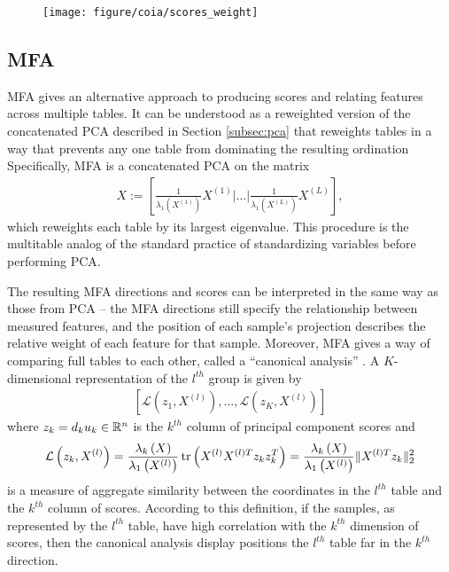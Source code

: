 \documentclass{article}
\begin{document}
\begin{figure}[ht]
  \centering
  \texttt{[image: figure/coia/scores\_weight]}
  \caption{\label{fig:label} }
\end{figure}

\subsection{MFA}
\label{sec:mfa}

MFA gives an alternative approach to producing scores and relating features
across multiple tables\cite{pages2014multiple}. It can be understood as a
reweighted version of the concatenated PCA described in Section \ref{subsec:pca}
that reweights tables in a way that prevents any one table from dominating the
resulting ordination Specifically, MFA is a concatenated PCA on the matrix
\begin{align*}
X := \left[\frac{1}{\lambda_{1}\left(X^{(1)}\right)}X^{(1)} \vert \dots
  \vert \frac{1}{\lambda_{1}\left(X^{(L)}\right)}X^{(L)}\right],
\end{align*}
which reweights each table by its largest eigenvalue. This procedure is the
multitable analog of the standard practice of standardizing variables before
performing PCA.

The resulting MFA directions and scores can be interpreted in the same
way as those from PCA -- the MFA directions still specify the
relationship between measured features, and the position of each
sample's projection describes the relative weight of each feature for
that sample. Moreover, MFA gives a way of comparing full tables to
each other, called a ``canonical analysis'' \cite{pages2004multiple}. A
$K$-dimensional representation of the $l^{th}$ group is given by
\begin{align*}
\left[\mathcal{L}\left(z_{1}, X^{(l)}\right), \dots,
  \mathcal{L}\left(z_{K}, X^{(l)}\right)\right]
\end{align*}
where $z_{k} = d_{k}u_{k} \in \mathbb{R}^{n}$ is the $k^{th}$ column of principal
component scores and
\begin{align*}
  \mathcal{L}\left(z_{k}, X^{(l)}\right) =
  \frac{\lambda_{k}\left(X\right)}{\lambda_{1}\left(X^{(l)}\right)}\mathop\mathrm{tr}\left(X^{(l)}X^{(l)
      T} z_{k}z_{k}^{T}\right) =
  \frac{\lambda_{k}\left(X\right)}{\lambda_{1}\left(X^{(l)}\right)}\|X^{(l)
  T} z_{k}\|^{2}_{2}
\end{align*}
is a measure of aggregate similarity between the coordinates in the $l^{th}$
table and the $k^{th}$ column of scores. According to this definition, if the
samples, as represented by the $l^{th}$ table, have high correlation with the
$k^{th}$ dimension of scores, then the canonical analysis display positions the
$l^{th}$ table far in the $k^{th}$ direction.
\end{document}
